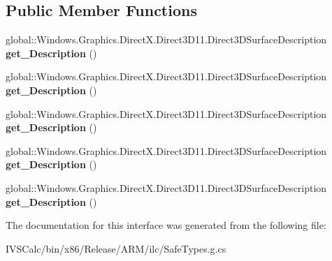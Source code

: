 \subsection*{Public Member Functions}
\begin{DoxyCompactItemize}
\item 
\mbox{\label{interface_windows_1_1_graphics_1_1_direct_x_1_1_direct3_d11_1_1_i_direct3_d_surface_a8385608576b7dec5dc5cb82ece3e63f7}} 
global\+::\+Windows.\+Graphics.\+Direct\+X.\+Direct3\+D11.\+Direct3\+D\+Surface\+Description {\bfseries get\+\_\+\+Description} ()
\item 
\mbox{\label{interface_windows_1_1_graphics_1_1_direct_x_1_1_direct3_d11_1_1_i_direct3_d_surface_a8385608576b7dec5dc5cb82ece3e63f7}} 
global\+::\+Windows.\+Graphics.\+Direct\+X.\+Direct3\+D11.\+Direct3\+D\+Surface\+Description {\bfseries get\+\_\+\+Description} ()
\item 
\mbox{\label{interface_windows_1_1_graphics_1_1_direct_x_1_1_direct3_d11_1_1_i_direct3_d_surface_a8385608576b7dec5dc5cb82ece3e63f7}} 
global\+::\+Windows.\+Graphics.\+Direct\+X.\+Direct3\+D11.\+Direct3\+D\+Surface\+Description {\bfseries get\+\_\+\+Description} ()
\item 
\mbox{\label{interface_windows_1_1_graphics_1_1_direct_x_1_1_direct3_d11_1_1_i_direct3_d_surface_a8385608576b7dec5dc5cb82ece3e63f7}} 
global\+::\+Windows.\+Graphics.\+Direct\+X.\+Direct3\+D11.\+Direct3\+D\+Surface\+Description {\bfseries get\+\_\+\+Description} ()
\item 
\mbox{\label{interface_windows_1_1_graphics_1_1_direct_x_1_1_direct3_d11_1_1_i_direct3_d_surface_a8385608576b7dec5dc5cb82ece3e63f7}} 
global\+::\+Windows.\+Graphics.\+Direct\+X.\+Direct3\+D11.\+Direct3\+D\+Surface\+Description {\bfseries get\+\_\+\+Description} ()
\end{DoxyCompactItemize}


The documentation for this interface was generated from the following file\+:\begin{DoxyCompactItemize}
\item 
I\+V\+S\+Calc/bin/x86/\+Release/\+A\+R\+M/ilc/Safe\+Types.\+g.\+cs\end{DoxyCompactItemize}
